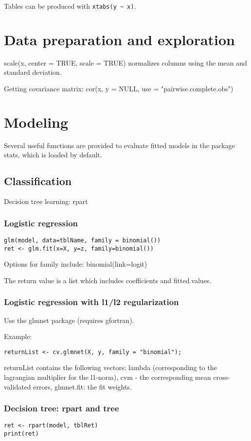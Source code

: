 Tables can be produced with \verb'xtabs(y ~ x)'.

\section{Data preparation and exploration}
scale(x, center = TRUE, scale = TRUE) normalizes columns using the mean and standard deviation.

Getting covariance matrix: cor(x, y = NULL, use = "pairwise.complete.obs")

\section{Modeling}
Several useful functions are provided to evaluate fitted models in the package stats, which is loaded by default.



\subsection{Classification}
Decision tree learning: rpart

\subsubsection{Logistic regression}
\begin{verbatim}
glm(model, data=tblName, family = binomial())
ret <- glm.fit(x=X, y=z, family=binomial())

\end{verbatim}
Options for family include: binomial(link=logit)

The return value is a list which includes coefficients and fitted.values.


\subsubsection{Logistic regression with l1/l2 regularization}
Use the glmnet package (requires gfortran).

Example:
\begin{verbatim}
returnList <- cv.glmnet(X, y, family = "binomial");
\end{verbatim}

returnList contains the following vectors: lambda (corresponding to the lagrangian multiplier for the l1-norm), cvm - the corresponding mean cross-validated errors, glmnet.fit: the fit weights.

\subsubsection{Decision tree: rpart and tree}
\begin{verbatim}
ret <- rpart(model, tblRet)
print(ret)
\end{verbatim}


